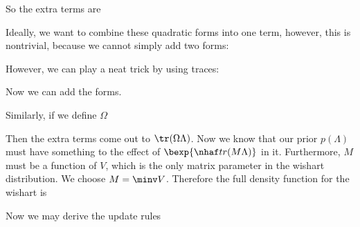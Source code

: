 \documentclass[12pt]{article}
\begin{document}

So the extra terms are

Ideally, we want to combine these quadratic forms into one term, however, this is nontrivial, because we cannot simply add two forms:


However, we can play a neat trick by using traces:


Now we can add the forms.


Similarly, if we define $\Omega$


Then the extra terms come out to $\tr(\Omega \Lambda)$. Now we know that our prior $p(\Lambda)$ must have something to the effect of $\bexp{\nhaf tr(M\Lambda)}$ in it. Furthermore, $M$ must be a function of $V$, which is the only matrix parameter in the wishart distribution. We choose $M = \minv V$. Therefore the full density function for the wishart is


Now we may derive the update rules

\end{document}
